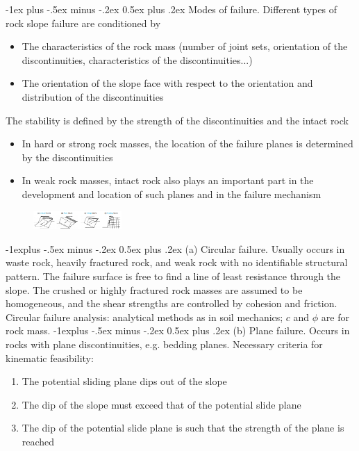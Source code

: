 \documentclass[10pt,landscape,a4paper]{article}
\makeatletter
\renewcommand{\section}{\@startsection{section}{1}{0mm}%
	{-1ex plus -.5ex minus -.2ex}%
	{0.5ex plus .2ex}%
	{\normalfont\large\bfseries}}
\renewcommand{\subsection}{\@startsection{subsection}{2}{0mm}%
	{-1explus -.5ex minus -.2ex}%
	{0.5ex plus .2ex}%
	{\normalfont\normalsize\bfseries}}
\makeatother
\begin{document}
\begin{multicols}{3}
		\section{Modes of failure.}
		Different types of rock slope failure are conditioned by
		\begin{itemize}
			\item The characteristics of the rock mass (number of joint sets, orientation of the discontinuities, characteristics of the discontinuities...)
			\item The orientation of the slope face with respect to the orientation and distribution of the discontinuities
		\end{itemize}
		The stability is defined by the strength of the discontinuities and the intact rock
		\begin{itemize}
			\item In hard or strong rock masses, the location of the failure planes is determined by the discontinuities
			\item In weak rock masses, intact rock also plays an important part in the development and location of such planes and in the failure mechanism
		\end{itemize}
		\begin{figure}[H]
			\centering
			\includegraphics[width=0.3\textwidth]{modes-of-failure}
		\end{figure}
		\subsection{(a) Circular failure.}
		Usually occurs in waste rock, heavily fractured rock, and weak rock with no identifiable structural pattern.
		The failure surface is free to find a line of least resistance through the slope.
		The crushed or highly fractured rock masses are assumed to be homogeneous, and the shear strengths are controlled by cohesion and friction.
		Circular failure analysis: analytical methods as in soil mechanics; $c$ and $\phi$ are for rock mass.
		\subsection{(b) Plane failure.}
		Occurs in rocks with plane discontinuities, e.g. bedding planes.
		Necessary criteria for kinematic feasibility:
		\begin{enumerate}
			\item The potential sliding plane dips out of the slope
			\item The dip of the slope must exceed that of the potential slide plane
			\item The dip of the potential slide plane is such that the strength of the plane is reached
		\end{enumerate}

\end{multicols}
\end{document}
